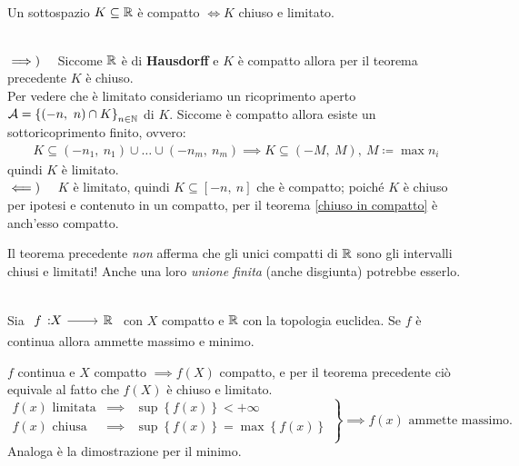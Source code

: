 \begin{theorema}~{}\label{compatto chiuso e limitato R}\\
Un sottospazio $K\subseteq \mathbb{R}$ è compatto $\iff K$ chiuso e limitato.
\end{theorema}
\begin{demonstration}~{}\\
	$\implies)\quad$ Siccome $\mathbb{R}$ è di \textbf{Hausdorff} e $K$ è compatto allora per il teorema precedente $K$ è chiuso.\\
	Per vedere che è limitato consideriamo un ricoprimento aperto $\mathcal{A}=\left\{ (-n,\ n)\cap K\right\}_{n\in\mathbb{N}}$ di $K$. Siccome è compatto allora esiste un sottoricoprimento finito, ovvero:
	\begin{gather*}
		K\subseteq (-n_1,\ n_1)\cup\ldots\cup(-n_m,\ n_m) \implies K\subseteq (-M,\ M), \ M\coloneqq \max n_i
	\end{gather*}
	quindi $K$ è limitato. \\
	$\impliedby)\quad $ $K$ è limitato, quindi $K\subseteq [-n, \ n]$ che è compatto; poiché $K$ è chiuso per ipotesi e contenuto in un compatto, per il teorema \ref{chiuso in compatto} è anch'esso compatto.
\end{demonstration}
\begin{attention}
	Il teorema precedente \textit{non} afferma che gli unici compatti di $\mathbb{R}$ sono gli intervalli chiusi e limitati! Anche una loro \textit{unione finita} (anche disgiunta) potrebbe esserlo.
\end{attention}

\begin{theorema}~{}\label{weierstrass}\\
Sia $\funz f X \realset$ con $X$ compatto e $\mathbb{R}$ con la topologia euclidea. Se $f$ è continua allora ammette massimo e minimo.
\end{theorema}
\begin{demonstration}
	$f$ continua e $X$ compatto $\implies f(X)$ compatto, e per il teorema precedente ciò equivale al fatto che $f(X)$ è chiuso e limitato.
	\begin{equation*}
		\left.
		\begin{array}{lcl}
			f\left(x\right)\text{ limitata}&\implies& \sup \left\{f\left(x\right)\right\}<+\infty\\
			f\left(x\right)\text{ chiusa}&\implies& \sup \left\{f\left(x\right)\right\}=\max \left\{f\left(x\right)\right\}\\
		\end{array}
		\right\}
		\implies f\left(x\right)\text{ ammette massimo.}
	\end{equation*}
	Analoga è la dimostrazione per il minimo.
\end{demonstration}

